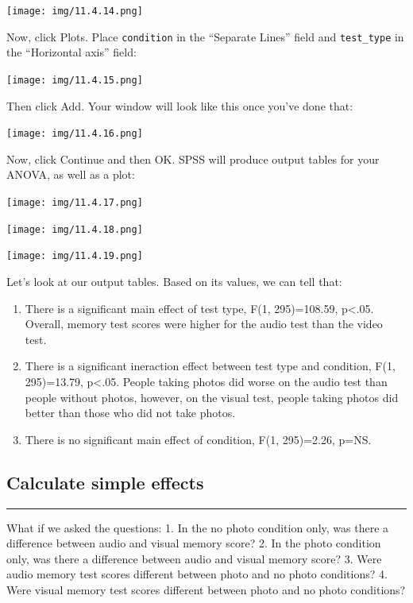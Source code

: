 \documentclass[]{book}
\begin{document}
\texttt{[image: img/11.4.14.png]}

Now, click {Plots}. Place \texttt{condition} in the ``Separate Lines''
field and \texttt{test\_type} in the ``Horizontal axis'' field:

\texttt{[image: img/11.4.15.png]}

Then click {Add}. Your window will look like this once you've done that:

\texttt{[image: img/11.4.16.png]}

Now, click {Continue} and then {OK}. SPSS will produce output tables for
your ANOVA, as well as a plot:

\texttt{[image: img/11.4.17.png]}

\texttt{[image: img/11.4.18.png]}

\texttt{[image: img/11.4.19.png]}

Let's look at our output tables. Based on its values, we can tell that:

\begin{enumerate}
\def\labelenumi{\arabic{enumi}.}
\item
  There is a significant main effect of test type, F(1, 295)=108.59,
  p\textless{}.05. Overall, memory test scores were higher for the audio
  test than the video test.
\item
  There is a significant ineraction effect between test type and
  condition, F(1, 295)=13.79, p\textless{}.05. People taking photos did
  worse on the audio test than people without photos, however, on the
  visual test, people taking photos did better than those who did not
  take photos.
\item
  There is no significant main effect of condition, F(1, 295)=2.26,
  p=NS.
\end{enumerate}

\subsection{Calculate simple effects}\label{calculate-simple-effects-2}

\begin{center}\rule{0.5\linewidth}{0.5pt}\end{center}

What if we asked the questions: 1. In the no photo condition only, was
there a difference between audio and visual memory score? 2. In the
photo condition only, was there a difference between audio and visual
memory score? 3. Were audio memory test scores different between photo
and no photo conditions? 4. Were visual memory test scores different
between photo and no photo conditions?
\end{document}
